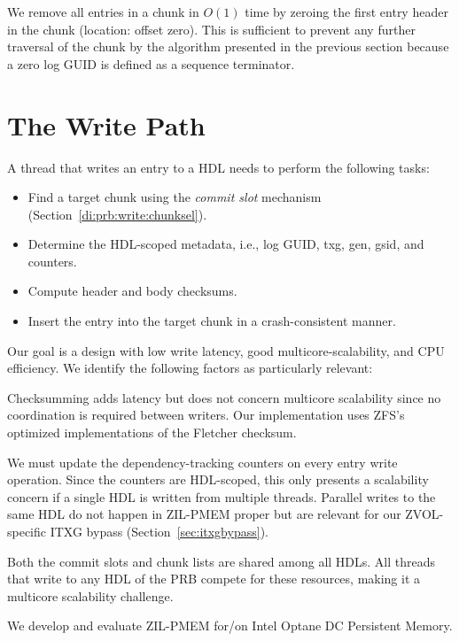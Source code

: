 \documentclass[12pt,a4paper,twoside]{book}
\begin{document}
{We remove all entries in a chunk in $O(1)$ time by zeroing the first entry header in the chunk (location: offset zero).
This is sufficient to prevent any further traversal of the chunk by the algorithm presented in the previous section because a zero log GUID is defined as a sequence terminator.

\section{The Write Path}\label{di:prb:write}
A thread that writes an entry to a HDL needs to perform the following tasks:
\begin{itemize}[noitemsep]
    \item Find a target chunk using the \textit{commit slot} mechanism (Section~\ref{di:prb:write:chunksel}).
    \item Determine the HDL-scoped metadata, i.e., log GUID, txg, gen, gsid, and counters.
    \item Compute header and body checksums.
    \item Insert the entry into the target chunk in a crash-consistent manner.
\end{itemize}
Our goal is a design with low write latency, good multicore-scalability, and CPU efficiency.
We identify the following factors as particularly relevant:
\begin{description}[noitemsep]
    \item[Checksumming] Checksumming adds latency but does not concern multicore scalability since no coordination is required between writers.
        Our implementation uses ZFS's optimized implementations of the Fletcher checksum.
    \item[Dependency Tracking Counters] We must update the dependency-tracking counters on every entry write operation.
        Since the counters are HDL-scoped, this only presents a scalability concern if a single HDL is written from multiple threads.
        Parallel writes to the same HDL do not happen in ZIL-PMEM proper but are relevant for our ZVOL-specific ITXG bypass (Section~\ref{sec:itxgbypass}).
    \item[Commit Slot Acquisition \& Chunk Replacement]
        Both the commit slots and chunk lists are shared among all HDLs.
        All threads that write to any HDL of the PRB compete for these resources, making it a multicore scalability challenge.
    \item[Optane Characteristics] We develop and evaluate ZIL-PMEM for/on Intel Optane DC Persistent Memory.

\end{description}}
\end{document}
